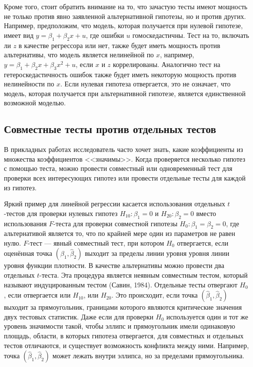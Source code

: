 Кроме того, стоит обратить внимание на то, что зачастую тесты имеют мощность не только против явно заявленной альтернативной гипотезы, но и против других. Например, предположим, что модель, которая получается при нулевой гипотезе, имеет вид $y = \beta_1 + \beta_2x + u$, где ошибки $u$ гомоскедастичны. Тест на то, включать ли $z$ в качестве регрессора или нет, также будет иметь мощность против альтернативы, что модель является нелинейной по $x$, например, $y = \beta_1 + \beta_2x + \beta_3x^2 + u$, если $x$ и $z$ коррелированы. Аналогично тест на гетероскедастичность ошибок также будет иметь некоторую мощность против нелинейности по $x$. Если нулевая гипотеза отвергается, это не означает, что модель, которая получается при альтернативной гипотезе, является единственной возможной моделью.

\subsection{Совместные тесты против отдельных тестов}

В прикладных работах исследователь часто хочет знать, какие коэффициенты из множества коэффициентов <<значимы>>. Когда проверяется несколько гипотез с помощью теста, можно провести совместный или одновременный тест для проверки всех интересующих гипотез или провести отдельные тесты для каждой из гипотез.

Яркий пример для линейной регрессии касается использования отдельных $t$-тестов для проверки нулевых гипотез $H_{10}: \beta_1 = 0$ и $H_{20}: \beta_2 = 0$ вместо использования $F$-теста для проверки совместной гипотезы $H_0: \beta_1 = \beta_2 = 0$, где альтернативой является то, что по крайней мере один из параметров не равен нулю. $F$-тест --- явный совместный тест, при котором $H_0$ отвергается, если оценённая точка $(\hat{\beta}_1, \hat{\beta}_2)$ выходит за пределы линии уровня уровня линии уровня функции плотности. В качестве альтернативы можно провести два отдельных $t$-теста. Эта процедура является неявным совместным тестом, который называют индуцированным тестом (Савин, 1984). Отдельные тесты отвергают $H_0$, если отвергается или $H_{10}$, или $H_{20}$. Это происходит, если точка $(\hat{\beta}_1, \hat{\beta}_2)$ выходит за прямоугольник, границами которого являются критические значения двух тестовых статистик. Даже если для проверки $H_0$ используется один и тот же уровень значимости такой, чтобы эллипс и прямоугольник имели одинаковую площадь, области, в которых гипотеза отвергается, для совместных и отдельных тестов отличаются, и существует возможность конфликта между ними. Например, точка $(\hat{\beta}_1, \hat{\beta}_2)$ может лежать внутри эллипса, но за пределами прямоугольника.

